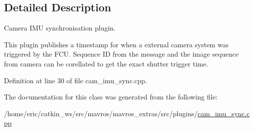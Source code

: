 \subsection{Detailed Description}
Camera I\+MU synchronisation plugin. 

This plugin publishes a timestamp for when a external camera system was triggered by the F\+CU. Sequence ID from the message and the image sequence from camera can be corellated to get the exact shutter trigger time. 

Definition at line 30 of file cam\+\_\+imu\+\_\+sync.\+cpp.



The documentation for this class was generated from the following file\+:\begin{DoxyCompactItemize}
\item 
/home/eric/catkin\+\_\+ws/src/mavros/mavros\+\_\+extras/src/plugins/\mbox{\hyperlink{cam__imu__sync_8cpp}{cam\+\_\+imu\+\_\+sync.\+cpp}}\end{DoxyCompactItemize}
